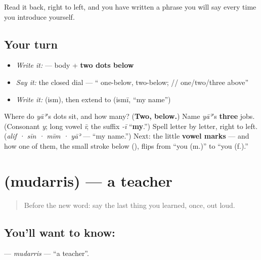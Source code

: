 Read it back, right to left, and you have written a phrase you will say every time you introduce yourself.

\subsection*{Your turn}
\begin{itemize}
\raggedright
  \item \emph{Write it:} \textbf{} — body + \textbf{two dots below}
  \item \emph{Say it:} the closed dial — \textquotedblleft{} one-below,  two-below; // one/two/three above\textquotedblright{}
  \item \emph{Write it:} \textbf{} (ism), then extend to \textbf{} (ismī, \textquotedblleft{}my name\textquotedblright{})
\end{itemize}

\begin{tcolorbox}[breakable,colback=teal!4,colframe=teal!35!black,title={Before you move on}]
Where do \emph{yāʾ}'s dots sit, and how many? (\textbf{Two, below.}) Name \emph{yāʾ}'s \textbf{three} jobs. (Consonant \emph{y}; long vowel \emph{ī}; the suffix \emph{-ī} \textquotedblleft{}\textbf{my}.\textquotedblright{}) Spell \textbf{} letter by letter, right to left. (\emph{alif · sīn · mīm · yāʾ} — \textquotedblleft{}my name.\textquotedblright{}) Next: the little \textbf{vowel marks} — and how one of them, the small stroke below (\textbf{}), flips \emph{} from \textquotedblleft{}you (m.)\textquotedblright{} to \textquotedblleft{}you (f.).\textquotedblright{}
\end{tcolorbox}
\section[\texorpdfstring{\ar{مُدَرِّس} (mudarris)}{مُدَرِّس (mudarris)}]{ (mudarris) — a teacher}

\label{lesson:AR-C02-mudarris}



\begin{quote}
Before the new word: say the last thing you learned, once, out loud.
\end{quote}

\subsection*{You'll want to know: }
\textbf{} — \emph{mudarris} — \textquotedblleft{}a teacher\textquotedblright{}.

